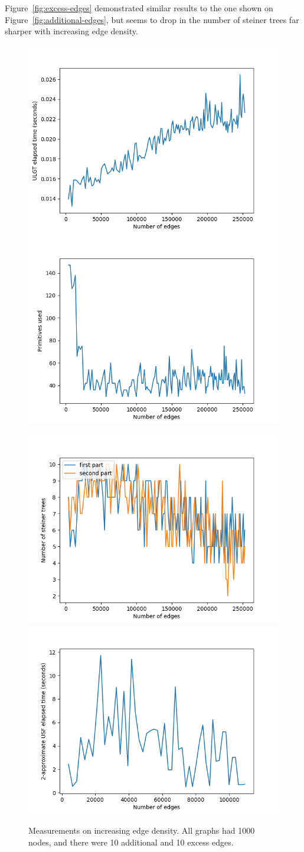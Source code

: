 \documentclass{article}
\begin{document}
Figure~\ref{fig:excess-edges} demonstrated similar results to the one shown on Figure~\ref{fig:additional-edges}, but seems to drop in the number of steiner trees far sharper with increasing edge density.

\begin{landscape}
\begin{figure}
  \vspace{-1.7cm}
  \centering
  \includegraphics[width=0.48\columnwidth]{figures/edge_density_time.png}
  \includegraphics[width=0.48\columnwidth]{figures/edge_density_primitive_count.png}
  
  \includegraphics[width=0.48\columnwidth]{figures/edge_density_steiner_tree_count.png}
  \includegraphics[width=0.48\columnwidth]{figures/edge_density_contraction_time.png}

  \caption{Measurements on increasing edge density. All graphs had 1000 nodes, and there were 10 additional and 10 excess edges.}
  \label{fig:edge-density}
\end{figure}
\end{landscape}
\end{document}

